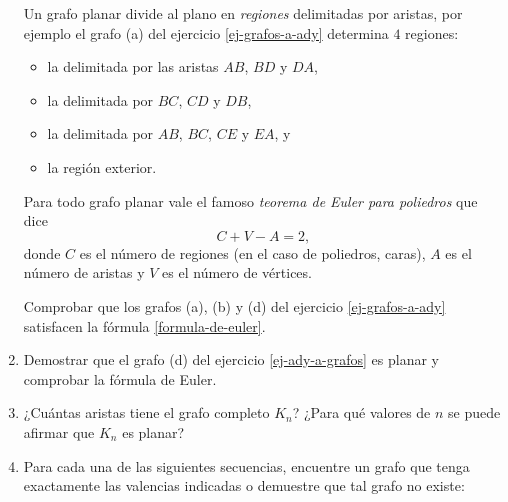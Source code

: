 \documentclass[a4paper,12pt,twoside,spanish,reqno]{amsbook}
\numberwithin{equation}{section}
\begin{document}
\begin{enumerate}
    Un  grafo planar divide al plano en \textit{regiones} delimitadas por aristas, por ejemplo el grafo (a) del ejercicio  \ref{ej-grafos-a-ady} determina $4$ regiones: 
    \begin{itemize}
        \item la delimitada por las aristas $AB$, $BD$ y $DA$,
        \item la delimitada por  $BC$, $CD$ y $DB$,
        \item  la delimitada por  $AB$, $BC$, $CE$ y $EA$, y 
        \item la región exterior.
    \end{itemize}
    Para todo grafo planar vale el famoso \textit{teorema de Euler para poliedros} que dice 
    \begin{equation}\label{formula-de-euler}
        C + V - A = 2, \tag{*}
    \end{equation}
    donde $C$ es el número de regiones (en el caso de poliedros, caras), $A$ es el número de aristas y $V$ es el número de vértices.

    Comprobar que los grafos (a), (b) y (d) del ejercicio  \ref{ej-grafos-a-ady} satisfacen la fórmula \eqref{formula-de-euler}. 


\item Demostrar que el grafo (d) del ejercicio \ref{ej-ady-a-grafos} es planar y comprobar la fórmula de Euler.

\item  ¿Cuántas aristas tiene el  grafo completo $K_n$? ¿Para qué valores de $n$ se puede afirmar que $K_n$ es planar?

\item Para cada una de las siguientes secuencias, encuentre un grafo que tenga exactamente las valencias indicadas o demuestre que tal grafo no existe:
\end{enumerate}
\end{document}
